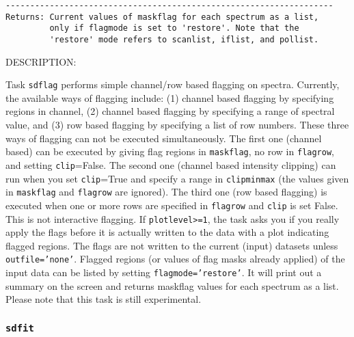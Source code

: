 \begin{verbatim}
-------------------------------------------------------------------
Returns: Current values of maskflag for each spectrum as a list, 
         only if flagmode is set to 'restore'. Note that the 
         'restore' mode refers to scanlist, iflist, and pollist.

\end{verbatim}

    DESCRIPTION:

    Task {\tt sdflag} performs simple channel/row based flagging on spectra.
    Currently, the available ways of flagging include: (1) channel based
    flagging by specifying regions in channel, (2) channel based flagging
    by specifying a range of spectral value, and (3) row based flagging by
    specifying a list of row numbers.
    These three ways of flagging can not be executed simultaneously.
    The first one (channel based) can be executed by giving flag regions
    in {\tt maskflag}, no row in {\tt flagrow}, and setting {\tt clip}=False.
    The second one (channel based intensity clipping) can run when you
    set {\tt clip}=True and specify a range in {\tt clipminmax} (the values
    given in {\tt maskflag} and {\tt flagrow} are ignored). The third
    one (row based flagging) is executed when one or more rows are
    specified in {\tt flagrow} and {\tt clip} is set False.
    This is not interactive flagging. If {\tt plotlevel>=1}, the task asks 
    you if you really apply the flags before it is actually written to the data 
    with a plot indicating flagged regions. The flags
    are not written to the current (input) datasets unless {\tt outfile='none'}.
    Flagged regions (or values of flag masks already applied) of the input data 
    can be listed by setting {\tt flagmode='restore'}. It will print out a summary on
    the screen and returns maskflag values for each spectrum as a list.
    Please note that this task is still experimental.

\subsubsection{{\tt sdfit}}
\label{section:sd.sdtasks.tasks.sdfit}

